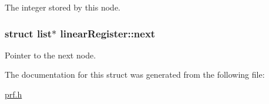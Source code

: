 The integer stored by this node. 

\hypertarget{structlinear_register_a423cdb42b705e8994d7a064612062551}{}
\subsubsection[{next}]{\setlength{\rightskip}{0pt plus 5cm}struct list$\ast$ linear\+Register\+::next}\label{structlinear_register_a423cdb42b705e8994d7a064612062551}


Pointer to the next node. 



The documentation for this struct was generated from the following file\+:\begin{DoxyCompactItemize}
\item 
\hyperlink{prf_8h}{prf.\+h}\end{DoxyCompactItemize}

